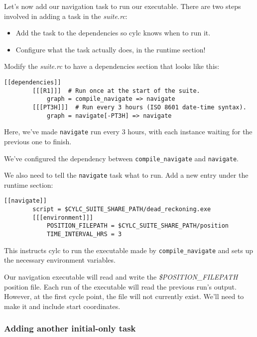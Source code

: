 Let's now add our navigation task to run our executable. There are two steps involved in adding a task in the {\em suite.rc}:
\begin{itemize}
    \item Add the task to the dependencies so cylc knows when to run it.
    \item Configure what the task actually does, in the runtime section!
\end{itemize}

Modify the {\em suite.rc} to have a dependencies section that looks like this:
\lstset{language=suiterc}
\begin{lstlisting}[columns=fullflexible]
    [[dependencies]]
        [[[R1]]]  # Run once at the start of the suite.
            graph = compile_navigate => navigate
        [[[PT3H]]]  # Run every 3 hours (ISO 8601 date-time syntax).
            graph = navigate[-PT3H] => navigate
\end{lstlisting}

Here, we've made \lstinline{navigate} run every 3 hours, with each instance waiting for the previous one to finish.

We've configured the dependency between \lstinline{compile_navigate} and \lstinline{navigate}.

We also need to tell the \lstinline{navigate} task what to run. Add a new entry under the runtime section:

\lstset{language=suiterc}
\begin{lstlisting}[columns=fullflexible]
    [[navigate]]
        script = $CYLC_SUITE_SHARE_PATH/dead_reckoning.exe
        [[[environment]]]
            POSITION_FILEPATH = $CYLC_SUITE_SHARE_PATH/position
            TIME_INTERVAL_HRS = 3
\end{lstlisting}

This instructs cylc to run the executable made by \lstinline{compile_navigate} and sets up the necessary environment variables.

Our navigation executable will read and write the {\em \$POSITION\_FILEPATH} position file. Each run of the executable will read the previous run's output. However, at the first cycle point, the file will not currently exist. We'll need to make it and include start coordinates.

\subsubsection{Adding another initial-only task}


